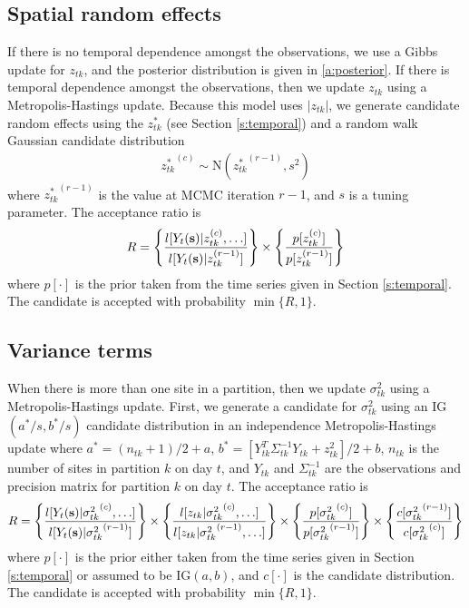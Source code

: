 \documentclass[useAMS,usenatbib,referee]{biomweb}
\begin{document}
\subsection*{Spatial random effects}
If there is no temporal dependence amongst the observations, we use a Gibbs update for $z_{tk}$, and the posterior distribution is given in \ref{a:posterior}.
If there is temporal dependence amongst the observations, then we update $z_{tk}$ using a Metropolis-Hastings update.
Because this model uses $|z_{tk}|$, we generate candidate random effects using the $z^*_{tk}$ (see Section \ref{s:temporal}) and a random walk Gaussian candidate distribution
\begin{align*}
  {z^*_{tk}}^{(c)} \sim \text{N}({z^*_{tk}}^{(r - 1)}, s^2)
\end{align*}
where ${z^*_{tk}}^{(r-1)}$ is the value at MCMC iteration $r - 1$, and $s$ is a tuning parameter.
The acceptance ratio is
\begin{align*}
  R = \left\{ \frac{ l[Y_t(\mbox{\bf s}) | z_{tk}^{(c)}, \ldots] }{ l[Y_t(\mbox{\bf s}) | z_{tk}^{(r - 1)}]} \right\} \times \left\{ \frac{ p[ z_{tk}^{(c)} ] }{ p[ z_{tk}^{(r - 1)}]}\right\}
\end{align*}
where $p[\cdot]$ is the prior taken from the time series given in Section \ref{s:temporal}.
The candidate is accepted with probability $\min\{R, 1\}$.

\subsection*{Variance terms}
When there is more than one site in a partition, then we update $\sigma^2_{tk}$ using a Metropolis-Hastings update.
First, we generate a candidate for $\sigma^2_{tk}$ using an IG$(a^*/s, b^*/s)$ candidate distribution in an independence Metropolis-Hastings update where $a^* = (n_{tk} + 1) / 2 + a$, $b^* = [Y_{tk}^T \Sigma^{-1}_{tk} Y_{tk} + z_{tk}^2] / 2 + b$, $n_{tk}$ is the number of sites in partition $k$ on day $t$, and $Y_{tk}$ and $\Sigma^{-1}_{tk}$ are the observations and precision matrix for partition $k$ on day $t$.
The acceptance ratio is
\begin{align*}
  R = \left\{
    \frac{ l[Y_t(\mbox{\bf s}) | {\sigma^2_{tk}}^{(c)}, \ldots] }
         { l[Y_t(\mbox{\bf s}) | {\sigma^2_{tk}}^{(r - 1)}]}
    \right\} \times \left\{
    \frac{ l[z_{tk} | {\sigma^2_{tk}}^{(c)}, \ldots] }
         { l[z_{tk} | {\sigma^2_{tk}}^{(r - 1)}, \ldots] }
    \right\} \times \left\{
    \frac{ p[ {\sigma^2_{tk}}^{(c)} ] }
         { p[ {\sigma^2_{tk}}^{(r - 1)}] }
    \right\} \times \left\{
    \frac{ c[ {\sigma^2_{tk}}^{(r - 1)}] }
         { c[ {\sigma^2_{tk}}^{(c)}]}
    \right\}
\end{align*}
where $p[\cdot]$ is the prior either taken from the time series given in Section \ref{s:temporal} or assumed to be IG$(a, b)$, and $c[\cdot]$ is the candidate distribution.
The candidate is accepted with probability $\min\{R, 1\}$.
\end{document}
